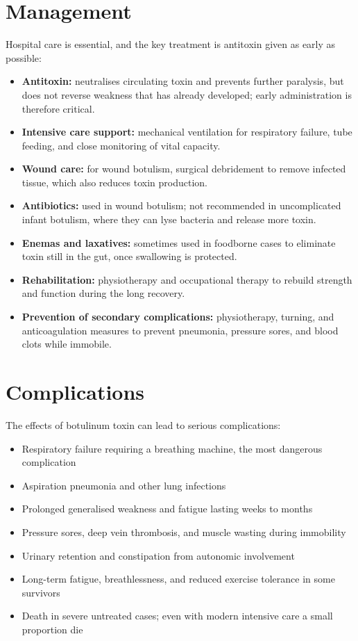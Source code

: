 \section*{Management}
Hospital care is essential, and the key treatment is antitoxin given as early as possible:
\begin{itemize}
    \item \textbf{Antitoxin:} neutralises circulating toxin and prevents further paralysis, but does not reverse weakness that has already developed; early administration is therefore critical.
    \item \textbf{Intensive care support:} mechanical ventilation for respiratory failure, tube feeding, and close monitoring of vital capacity.
    \item \textbf{Wound care:} for wound botulism, surgical debridement to remove infected tissue, which also reduces toxin production.
    \item \textbf{Antibiotics:} used in wound botulism; not recommended in uncomplicated infant botulism, where they can lyse bacteria and release more toxin.
    \item \textbf{Enemas and laxatives:} sometimes used in foodborne cases to eliminate toxin still in the gut, once swallowing is protected.
    \item \textbf{Rehabilitation:} physiotherapy and occupational therapy to rebuild strength and function during the long recovery.
    \item \textbf{Prevention of secondary complications:} physiotherapy, turning, and anticoagulation measures to prevent pneumonia, pressure sores, and blood clots while immobile.
\end{itemize}

\section*{Complications}
The effects of botulinum toxin can lead to serious complications:
\begin{itemize}
    \item Respiratory failure requiring a breathing machine, the most dangerous complication
    \item Aspiration pneumonia and other lung infections
    \item Prolonged generalised weakness and fatigue lasting weeks to months
    \item Pressure sores, deep vein thrombosis, and muscle wasting during immobility
    \item Urinary retention and constipation from autonomic involvement
    \item Long-term fatigue, breathlessness, and reduced exercise tolerance in some survivors
    \item Death in severe untreated cases; even with modern intensive care a small proportion die
\end{itemize}

